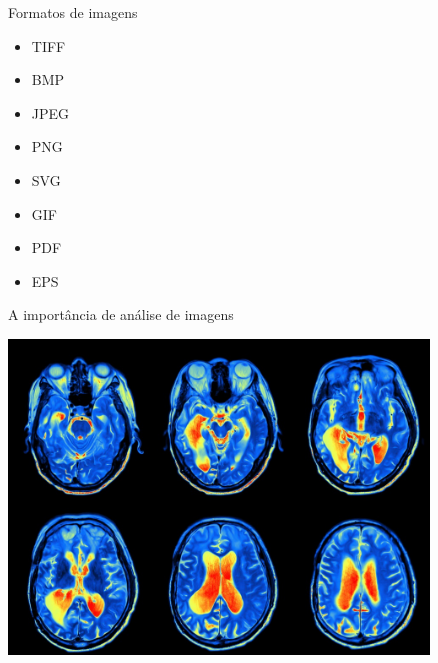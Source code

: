 \documentclass[
  ignorenonframetext,
]{beamer}
\begin{document}
\begin{frame}{Formatos de imagens}
\protect\hypertarget{formatos-de-imagens}{}

\small

\begin{itemize}
    \item TIFF
    \item BMP
    \item JPEG
    \item PNG
    \item SVG
    \item GIF
    \item PDF
    \item EPS
\end{itemize}

\end{frame}

\begin{frame}{A importância de análise de imagens}
\protect\hypertarget{a-importuxe2ncia-de-anuxe1lise-de-imagens}{}

\small

\includegraphics[width=4.4in]{IMAGENS/raiox}

\begin{center}
\tiny{}
\end{center}

\end{frame}
\end{document}
